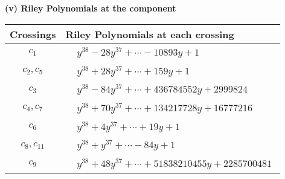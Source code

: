 \documentclass[1p]{elsarticle_modified}
\theoremstyle{definition}
\begin{document}
\newpage\renewcommand{\arraystretch}{1}
\flushleft \textbf{(v) Riley Polynomials at the component}\newline \\
\begin{tabular}{m{50pt}|m{274pt}}
Crossings & \hspace{64pt}Riley Polynomials at each crossing \\
\hline $$\begin{aligned}c_{1}\end{aligned}$$&$\begin{aligned}
&y^{38}-28 y^{37}+\cdots-10893 y+1
\end{aligned}$\\
\hline $$\begin{aligned}c_{2},c_{5}\end{aligned}$$&$\begin{aligned}
&y^{38}+28 y^{37}+\cdots+159 y+1
\end{aligned}$\\
\hline $$\begin{aligned}c_{3}\end{aligned}$$&$\begin{aligned}
&y^{38}-84 y^{37}+\cdots+436784552 y+2999824
\end{aligned}$\\
\hline $$\begin{aligned}c_{4},c_{7}\end{aligned}$$&$\begin{aligned}
&y^{38}+70 y^{37}+\cdots+134217728 y+16777216
\end{aligned}$\\
\hline $$\begin{aligned}c_{6}\end{aligned}$$&$\begin{aligned}
&y^{38}+4 y^{37}+\cdots+19 y+1
\end{aligned}$\\
\hline $$\begin{aligned}c_{8},c_{11}\end{aligned}$$&$\begin{aligned}
&y^{38}+y^{37}+\cdots-84 y+1
\end{aligned}$\\
\hline $$\begin{aligned}c_{9}\end{aligned}$$&$\begin{aligned}
&y^{38}+48 y^{37}+\cdots+51838210455 y+2285700481
\end{aligned}$\\

\end{tabular}
\end{document}
